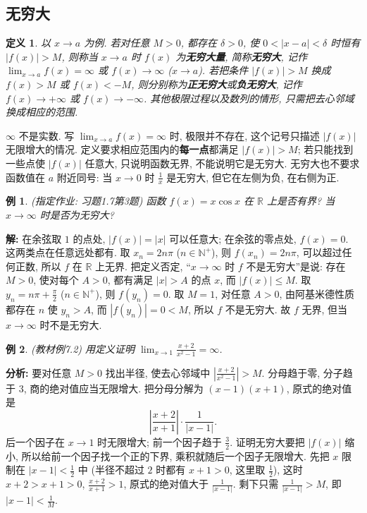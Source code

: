 \documentclass[UTF8,openany]{ctexbook}
\theoremstyle{chinesetextbook}
\newtheorem{definition}{定义}[section]
\newtheorem{example}{例}[section]
\newenvironment{cnsolution}{\par\indent\textbf{解:} \ignorespaces}{\par}
\begin{document}
\subsection{无穷大}
\begin{definition}
以 $x\to a$ 为例. 若对任意 $M>0$, 都存在 $\delta>0$, 使 $0<|x-a|<\delta$ 时恒有 $|f(x)|>M$, 则称当 $x\to a$ 时 $f(x)$ 为\textbf{无穷大量}, 简称\textbf{无穷大}, 记作 $\displaystyle\lim_{x\to a}f(x)=\infty$ 或 $f(x)\to\infty$ ($x\to a$). 若把条件 $|f(x)|>M$ 换成 $f(x)>M$ 或 $f(x)<-M$, 则分别称为\textbf{正无穷大}或\textbf{负无穷大}, 记作 $f(x)\to+\infty$ 或 $f(x)\to-\infty$. 其他极限过程以及数列的情形, 只需把去心邻域换成相应的范围.
\end{definition}
$\infty$ 不是实数. 写 $\displaystyle\lim_{x\to a}f(x)=\infty$ 时, 极限并不存在, 这个记号只描述 $|f(x)|$ 无限增大的情况. 定义要求相应范围内的\textbf{每一点}都满足 $|f(x)|>M$; 若只能找到一些点使 $|f(x)|$ 任意大, 只说明函数无界, 不能说明它是无穷大. 无穷大也不要求函数值在 $a$ 附近同号: 当 $x\to0$ 时 $\displaystyle\frac1x$ 是无穷大, 但它在左侧为负, 在右侧为正.
\begin{example}
\textnormal{(指定作业: 习题1.7第3题)} 函数 $f(x)=x\cos x$ 在 $\mathbb R$ 上是否有界? 当 $x\to\infty$ 时是否为无穷大?
\end{example}
\begin{cnsolution}
在余弦取 $1$ 的点处, $|f(x)|=|x|$ 可以任意大; 在余弦的零点处, $f(x)=0$. 这两类点在任意远处都有. 取 $x_n=2n\pi$ ($n\in\mathbb N^+$), 则 $f(x_n)=2n\pi$, 可以超过任何正数, 所以 $f$ 在 $\mathbb R$ 上无界. 把定义否定, “$x\to\infty$ 时 $f$ 不是无穷大”是说: 存在 $M>0$, 使对每个 $A>0$, 都有满足 $|x|>A$ 的点 $x$, 而 $|f(x)|\le M$. 取 $\displaystyle y_n=n\pi+\frac\pi2$ ($n\in\mathbb N^+$), 则 $f(y_n)=0$. 取 $M=1$, 对任意 $A>0$, 由阿基米德性质都存在 $n$ 使 $y_n>A$, 而 $|f(y_n)|=0<M$, 所以 $f$ 不是无穷大. 故 $f$ 无界, 但当 $x\to\infty$ 时不是无穷大.
\end{cnsolution}
\begin{example}
\textnormal{(教材例7.2)} 用定义证明 $\displaystyle\lim_{x\to1}\frac{x+2}{x^2-1}=\infty$.
\end{example}
\par\indent\textbf{分析:} 要对任意 $M>0$ 找出半径, 使去心邻域中 $\displaystyle\left|\frac{x+2}{x^2-1}\right|>M$. 分母趋于零, 分子趋于 $3$, 商的绝对值应当无限增大. 把分母分解为 $(x-1)(x+1)$, 原式的绝对值是
\[
\left|\frac{x+2}{x+1}\right|\cdot\frac1{|x-1|}.
\]
后一个因子在 $x\to1$ 时无限增大; 前一个因子趋于 $\displaystyle\frac32$. 证明无穷大要把 $|f(x)|$ 缩小, 所以给前一个因子找一个正的下界, 乘积就随后一个因子无限增大. 先把 $x$ 限制在 $\displaystyle|x-1|<\frac12$ 中 (半径不超过 $2$ 时都有 $x+1>0$, 这里取 $\displaystyle\frac12$), 这时 $x+2>x+1>0$, $\displaystyle\frac{x+2}{x+1}>1$, 原式的绝对值大于 $\displaystyle\frac1{|x-1|}$. 剩下只需 $\displaystyle\frac1{|x-1|}>M$, 即 $\displaystyle|x-1|<\frac1M$.
\end{document}
